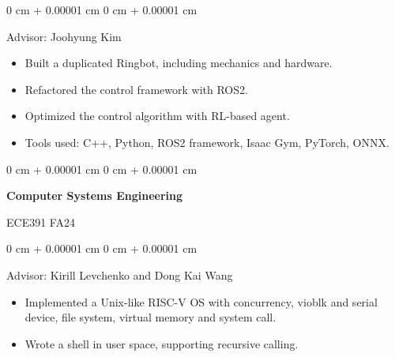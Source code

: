 \documentclass[10pt, letterpaper]{article}
\newenvironment{highlights}{
    \begin{itemize}[
        topsep=0.10 cm,
        parsep=0.10 cm,
        partopsep=0pt,
        itemsep=0pt,
        leftmargin=0 cm + 10pt
    ]
}{
    \end{itemize}
} %
\newenvironment{onecolentry}{
    \begin{adjustwidth}{
        0 cm + 0.00001 cm
    }{
        0 cm + 0.00001 cm
    }
}{
    \end{adjustwidth}
} %
\newenvironment{twocolentry}[2][]{
    \onecolentry
    \def\secondColumn{#2}
    \setcolumnwidth{\fill, 4.5 cm}
    \begin{paracol}{2}
}{
    \switchcolumn \raggedleft \secondColumn
    \end{paracol}
    \endonecolentry
} %
\begin{document}
        \vspace{0.10 cm}
        \begin{onecolentry}
            Advisor: Joohyung Kim
            \begin{highlights}
                \item Built a duplicated Ringbot, including mechanics and hardware.
                \item Refactored the control framework with ROS2.
                \item Optimized the control algorithm with RL-based agent.
                \item Tools used: C++, Python, ROS2 framework, Isaac Gym, PyTorch, ONNX.
            \end{highlights}
        \end{onecolentry}

        \vspace{0.2 cm}

        \begin{twocolentry} {
            ECE391 FA24
        }
            \textbf{Computer Systems Engineering}
        \end{twocolentry}

        \vspace{0.10 cm}
        \begin{onecolentry}
            Advisor: Kirill Levchenko and Dong Kai Wang
            \begin{highlights}
                \item Implemented a Unix-like RISC-V OS with concurrency, vioblk and serial device, file system, virtual memory and system call.
                \item Wrote a shell in user space, supporting recursive calling.
            \end{highlights}
        \end{onecolentry}

        \vspace{0.2 cm}
\end{document}
